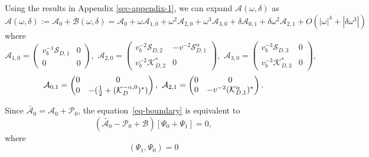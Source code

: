 \documentclass[11pt]{article}
\numberwithin{equation}{section}
\newcommand\1{{\ensuremath {\mathds 1} }}
\begin{document}
 Using the results in Appendix \ref{sec-appendix-1}, we can expand $\mathcal{A}(\omega,\delta)$ as
\begin{equation} \label{expdA}
\mathcal{A}(\omega, \delta):=\mathcal{A}_0 + \mathcal{B}(\omega, \delta)
= \mathcal{A}_0 + \omega \mathcal{A}_{1, 0}+ \omega^2 \mathcal{A}_{2, 0}
+ \omega^3 \mathcal{A}_{3, 0} + \delta \mathcal{A}_{0, 1}+ \delta \omega^2\mathcal{A}_{2, 1} + O(| \omega| ^4 + |\delta \omega^3|)
\end{equation}
where 
\[
\mathcal{A}_{1,0} = \begin{pmatrix}
  v_b^{-1} \mathcal{S}_{D,1} & 0 \\
  0& 0
\end{pmatrix},
\,\, \mathcal{A}_{2,0}= 
\begin{pmatrix}
  v_b^{-2} \mathcal{S}_{D,2} &  -v^{-2}\mathcal{S}_{D,1}^\alpha  \\
  v_b^{-2} \mathcal{K}_{D,2}^* & 0
\end{pmatrix},
\,\, \mathcal{A}_{3,0}= 
\begin{pmatrix}
  v_b^{-3}\mathcal{S}_{D,3} & 0  \\
 v_b^{-3} \mathcal{K}_{D,3}^*& 0
\end{pmatrix},
\]
\[
\mathcal{A}_{0, 1}=
\begin{pmatrix}
0& 0\\
0 &  -(\frac{1}{2}+ (\mathcal{K}_{D}^{-\alpha,0})^*)
\end{pmatrix},
\,\,  \mathcal{A}_{2, 1}=
\begin{pmatrix}
0& 0\\
0 &  -v^{-2}(\mathcal{K}^{\alpha}_{D,1})^*
\end{pmatrix}.
\]



Since $\tilde{\mathcal{A}_0}= \mathcal{A}_0 + \mathcal{P}_0$,  the equation~\eqref{eq-boundary} is equivalent to 
$$
(\tilde{\mathcal{A}_0} - \mathcal{P}_0 + \mathcal{B}) [\Psi_0 + \Psi_1]=0,
$$
where 
$$
(\Psi_1, \Psi_0)=0
$$
\end{document}
